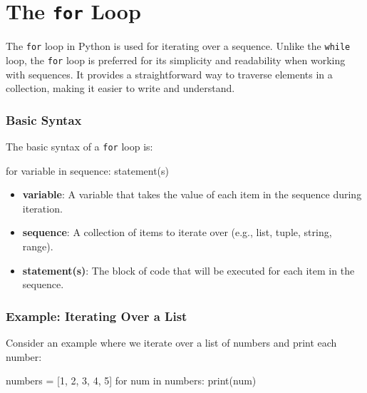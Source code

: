 \documentclass[
  letterpaper,
  DIV=11,
  numbers=noendperiod]{scrreprt}
\newenvironment{Shaded}{\begin{snugshade}}{\end{snugshade}}
\newcommand{\BuiltInTok}[1]{\textcolor[rgb]{0.00,0.23,0.31}{#1}}
\newcommand{\ControlFlowTok}[1]{\textcolor[rgb]{0.00,0.23,0.31}{#1}}
\newcommand{\DecValTok}[1]{\textcolor[rgb]{0.68,0.00,0.00}{#1}}
\newcommand{\KeywordTok}[1]{\textcolor[rgb]{0.00,0.23,0.31}{#1}}
\newcommand{\NormalTok}[1]{\textcolor[rgb]{0.00,0.23,0.31}{#1}}
\newcommand{\OperatorTok}[1]{\textcolor[rgb]{0.37,0.37,0.37}{#1}}
\providecommand{\tightlist}{%
  \setlength{\itemsep}{0pt}\setlength{\parskip}{0pt}}\usepackage{longtable,booktabs,array}
\begin{document}
\hypertarget{the-for-loop}{%
\section{\texorpdfstring{The \texttt{for}
Loop}{The for Loop}}\label{the-for-loop}}

The \texttt{for} loop in Python is used for iterating over a sequence.
Unlike the \texttt{while} loop, the \texttt{for} loop is preferred for
its simplicity and readability when working with sequences. It provides
a straightforward way to traverse elements in a collection, making it
easier to write and understand.

\hypertarget{basic-syntax-4}{%
\subsubsection{Basic Syntax}\label{basic-syntax-4}}

The basic syntax of a \texttt{for} loop is:

\begin{Shaded}
\begin{Highlighting}[]
\ControlFlowTok{for}\NormalTok{ variable }\KeywordTok{in}\NormalTok{ sequence:}
\NormalTok{    statement(s)}
\end{Highlighting}
\end{Shaded}

\begin{itemize}
\tightlist
\item
  \textbf{variable}: A variable that takes the value of each item in the
  sequence during iteration.
\item
  \textbf{sequence}: A collection of items to iterate over (e.g., list,
  tuple, string, range).
\item
  \textbf{statement(s)}: The block of code that will be executed for
  each item in the sequence.
\end{itemize}

\hypertarget{example-iterating-over-a-list}{%
\subsubsection{Example: Iterating Over a
List}\label{example-iterating-over-a-list}}

Consider an example where we iterate over a list of numbers and print
each number:

\begin{Shaded}
\begin{Highlighting}[]
\NormalTok{numbers }\OperatorTok{=}\NormalTok{ [}\DecValTok{1}\NormalTok{, }\DecValTok{2}\NormalTok{, }\DecValTok{3}\NormalTok{, }\DecValTok{4}\NormalTok{, }\DecValTok{5}\NormalTok{]}
\ControlFlowTok{for}\NormalTok{ num }\KeywordTok{in}\NormalTok{ numbers:}
    \BuiltInTok{print}\NormalTok{(num)}
\end{Highlighting}
\end{Shaded}
\end{document}
